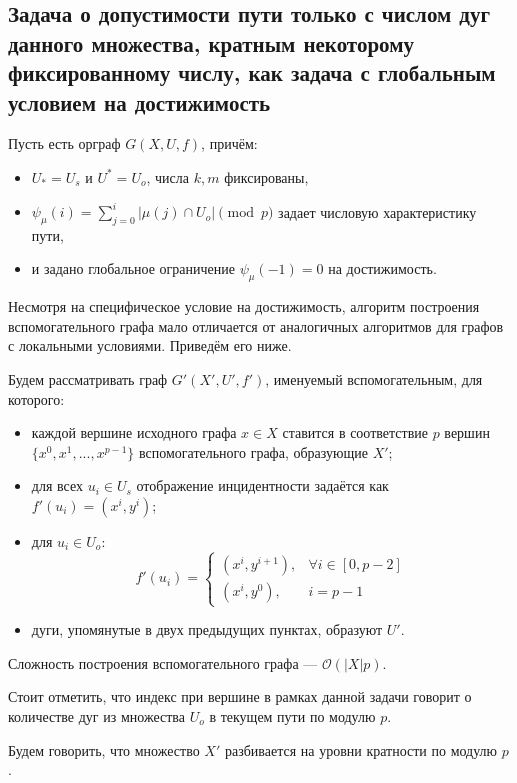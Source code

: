 \newpage

\subsection{Задача о допустимости пути только с числом дуг данного множества, кратным некоторому фиксированному числу, как задача с глобальным условием на достижимость}

Пусть есть орграф $G(X,U,f)$, причём:
\begin{itemize}
	\item $U_* = U_s$ и $U^* = U_o$, числа $k, m$ фиксированы,
	\item $\psi_\mu(i) = \sum\limits_{j=0}^i | \mu(j) \cap U_o | \pmod p$ задает числовую характеристику пути, 
	\item и задано глобальное ограничение $\psi_\mu(-1) = 0$ на достижимость.
\end{itemize}

Несмотря на специфическое условие на достижимость, алгоритм построения вспомогательного графа мало отличается от аналогичных алгоритмов для графов с локальными условиями. Приведём его ниже.

Будем рассматривать граф $G'(X',U',f')$, именуемый вспомогательным, для которого: 
\begin{itemize}
	\item каждой вершине исходного графа $x \in X$ ставится в соответствие $p$ вершин $\{x^0, x^1, ... , x^{p-1} \}$ вспомогательного графа, образующие $X'$;
	\item для всех $u_i \in U_s$ отображение инцидентности задаётся как $f'(u_i) = (x^i, y^i)$;
	\item для $u_i \in U_o$:
	\begin{equation*}
	f'(u_i) = 
	\begin{cases}
	(x^i, y^{i+1}), &\text{$\forall i \in [0, p-2]$}\\
	(x^i, y^0), &\text{$i = p-1$}
	\end{cases}
	\end{equation*}
	\item дуги, упомянутые в двух предыдущих пунктах, образуют $U'$.
\end{itemize}

Сложность построения вспомогательного графа --- $\mathcal{O}(|X|p)$.

Стоит отметить, что индекс при вершине в рамках данной задачи говорит о количестве дуг из множества $U_o$ в текущем пути по модулю $p$. 

\begin{definition}
	Будем говорить, что множество $X'$ разбивается на уровни кратности по модулю $p$.
\end{definition}

